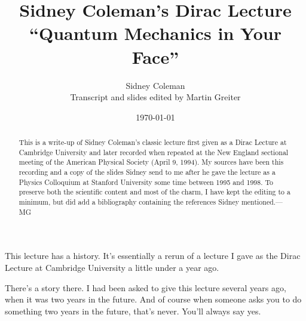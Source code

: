 \documentclass[12pt,nofootinbib]{revtex4}
\begin{document}
\title{Sidney Coleman's Dirac Lecture ``Quantum Mechanics in Your Face''}
\author{Sidney Coleman\\[6pt]  Transcript and slides edited by Martin Greiter}

\pagestyle{plain}
\date{\today}

\begin{abstract}
This is a write-up of Sidney Coleman's classic lecture first given as a Dirac Lecture at Cambridge University and later recorded when repeated at the New England sectional meeting of the American Physical Society (April 9, 1994).  My sources have been this recording  \cite{coleman} and a copy of the slides Sidney send to me after he gave the lecture as a Physics Colloquium at Stanford University some time between 1995 and 1998.  To preserve both the scientific content and most of the charm, I have kept the editing to a minimum, but did add a bibliography containing the references Sidney mentioned.---MG
\end{abstract}

\maketitle

This lecture has a history.
It's essentially a rerun of a lecture I gave as the Dirac Lecture at Cambridge University a little under a year ago.

There's a story there.
I had been asked to give this lecture several years ago, when it was two years in the future. And of course when someone asks you to do something two years in the future, that's never. You'll always say yes.
\end{document}
